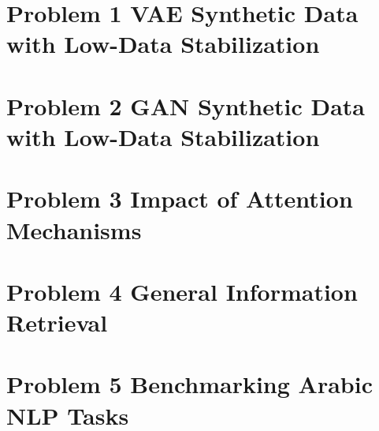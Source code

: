 \documentclass[12pt,a4paper]{article}
\begin{document}
\section{Problem 1 VAE Synthetic Data with Low-Data Stabilization}

\newpage

\section{Problem 2 GAN Synthetic Data with Low-Data Stabilization}

\newpage

\section{Problem 3  Impact of Attention Mechanisms}

\newpage

\section{Problem 4 General Information Retrieval}

\newpage

\normalfont
\section{Problem 5 Benchmarking Arabic NLP Tasks}
\normalfont

\normalfont
\newpage
\end{document}

